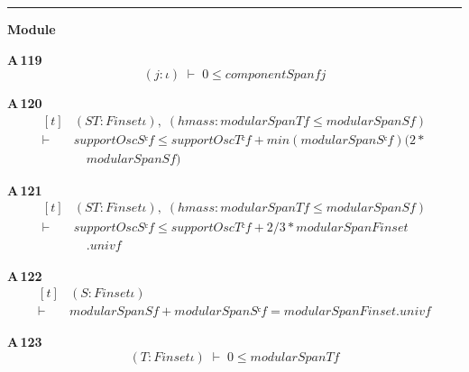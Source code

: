 \vspace{4pt}\noindent\rule{\columnwidth}{0.4pt}\par\vspace{2pt}
\noindent\textbf{Module }\par\vspace{3pt}

\noindent\textbf{A\,119}\quad{}
{\footnotesize\[ (\mathit{j} : \iota ) \;\vdash\; 0 \leq \mathit{componentSpan} \mathit{f} \mathit{j} \]}

\noindent\textbf{A\,120}\quad{}
{\footnotesize\[ \begin{aligned}[t]
&(\mathit{S} \mathit{T} : \mathit{Finset} \iota ),\; (\mathit{hmass} : \mathit{modularSpan} \mathit{T} \mathit{f} \leq \mathit{modularSpan} \mathit{S} \mathit{f})\\
\vdash\;&\mathit{supportOsc} \mathit{Sᶜ} \mathit{f} \leq \mathit{supportOsc} \mathit{Tᶜ} \mathit{f} + \mathit{min} (\mathit{modularSpan} \mathit{Sᶜ} \mathit{f}) (2 *\\
&\quad \mathit{modularSpan} \mathit{S} \mathit{f})
\end{aligned} \]}

\noindent\textbf{A\,121}\quad{}
{\footnotesize\[ \begin{aligned}[t]
&(\mathit{S} \mathit{T} : \mathit{Finset} \iota ),\; (\mathit{hmass} : \mathit{modularSpan} \mathit{T} \mathit{f} \leq \mathit{modularSpan} \mathit{S} \mathit{f})\\
\vdash\;&\mathit{supportOsc} \mathit{Sᶜ} \mathit{f} \leq \mathit{supportOsc} \mathit{Tᶜ} \mathit{f} + 2 / 3 * \mathit{modularSpan} \mathit{Finset}\\
&\quad .\mathit{univ} \mathit{f}
\end{aligned} \]}

\noindent\textbf{A\,122}\quad{}
{\footnotesize\[ \begin{aligned}[t]
&(\mathit{S} : \mathit{Finset} \iota )\\
\vdash\;&\mathit{modularSpan} \mathit{S} \mathit{f} + \mathit{modularSpan} \mathit{Sᶜ} \mathit{f} = \mathit{modularSpan} \mathit{Finset}.\mathit{univ} \mathit{f}
\end{aligned} \]}

\noindent\textbf{A\,123}\quad{}
{\footnotesize\[ (\mathit{T} : \mathit{Finset} \iota ) \;\vdash\; 0 \leq \mathit{modularSpan} \mathit{T} \mathit{f} \]}


